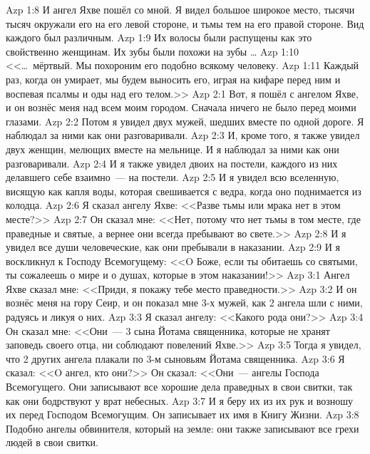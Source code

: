 \vs Azp 1:8
И ангел Яхве пошёл со мной.
Я видел большое широкое место,
тысячи тысяч окружали его на его левой стороне,
и тьмы тем на его правой стороне.
Вид каждого был различным.
\vs Azp 1:9
Их волосы были распущены как это свойственно женщинам.
Их зубы были похожи на зубы \ldots
{}
\vs Azp 1:10
<<\ldots\ мёртвый.
Мы похороним его подобно всякому человеку.
\vs Azp 1:11
Каждый раз, когда он умирает, мы будем выносить его,
играя на кифаре перед ним и воспевая псалмы и оды над его телом.>>
\vs Azp 2:1
Вот, я пошёл с ангелом Яхве,
и он вознёс меня над всем моим городом.
Сначала ничего не было перед моими глазами.
\vs Azp 2:2
Потом я увидел двух мужей, шедших вместе по одной дороге.
Я наблюдал за ними как они разговаривали.
\vs Azp 2:3
И, кроме того, я также увидел двух женщин,
мелющих вместе на мельнице.
И я наблюдал за ними как они разговаривали.
\vs Azp 2:4
И я также увидел двоих на постели,
каждого из них делавшего себе взаимно~--- на постели.
\vs Azp 2:5
И я увидел всю вселенную, висящую как капля воды,
которая свешивается с ведра, когда оно поднимается из колодца.
\vs Azp 2:6
Я сказал ангелу Яхве:
<<Разве тьмы или мрака нет в этом месте?>>
\vs Azp 2:7
Он сказал мне:
<<Нет, потому что нет тьмы в том месте,
где праведные и святые, а вернее они всегда пребывают во свете.>>
\vs Azp 2:8
И я увидел все души человеческие, как они пребывали в наказании.
\vs Azp 2:9
И я воскликнул к Господу Всемогущему:
<<O Боже, если ты обитаешь со святыми, ты сожалеешь о мире и о душах,
которые в этом наказании!>>
\vs Azp 3:1
Ангел Яхве сказал мне:
<<Приди, я покажу тебе место праведности.>>
\vs Azp 3:2
И он вознёс меня на гору Сеир, и он показал мне 3-х мужей,
как 2 ангела шли с ними, радуясь и ликуя о них.
\vs Azp 3:3
Я сказал ангелу:
<<Какого рода они?>>
\vs Azp 3:4
Он сказал мне:
<<Они~--- 3 сына Йотама священника,
которые не хранят заповедь своего отца,
ни соблюдают повелений Яхве.>>
\vs Azp 3:5
Тогда я увидел, что 2 других ангела плакали
по 3-м сыновьям Йотама священника.
\vs Azp 3:6
Я сказал:
<<O ангел, кто они?>>
Он сказал:
<<Они~--- ангелы Господа Всемогущего.
Они записывают все хорошие дела праведных в свои свитки,
так как они бодрствуют у врат небесных.
\vs Azp 3:7
И я беру их из их рук и возношу их перед Господом Всемогущим.
Он записывает их имя в Книгу Жизни.
\vs Azp 3:8
Подобно ангелы обвинителя, который на земле:
они также записывают все грехи людей в свои свитки.
